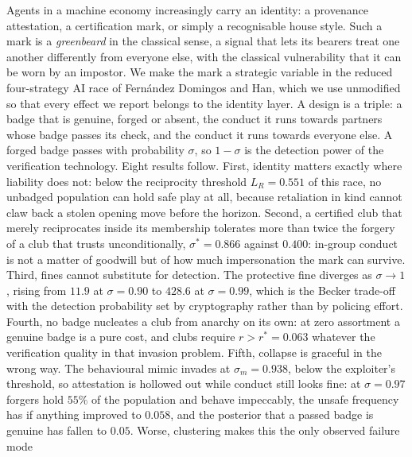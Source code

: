\noindent
Agents in a machine economy increasingly carry an identity: a provenance
attestation, a certification mark, or simply a recognisable house style. Such a
mark is a \emph{greenbeard} in the classical sense, a signal that lets its
bearers treat one another differently from everyone else, with the classical
vulnerability that it can be worn by an impostor. We make the mark a strategic
variable in the reduced four-strategy AI race of Fern\'andez Domingos and Han,
which we use unmodified so that every effect we report belongs to the identity
layer. A design is a triple: a badge that is genuine, forged or absent, the
conduct it runs towards partners whose badge passes its check, and the conduct
it runs towards everyone else. A forged badge passes with probability $\sigma$,
so $1 - \sigma$ is the detection power of the verification technology.
Eight results follow. First, identity matters exactly where liability does not:
below the reciprocity threshold $L_R = 0.551$ of this race, no unbadged
population can hold safe play at all, because retaliation in kind cannot claw
back a stolen opening move before the horizon. Second, a certified club that
merely reciprocates inside its membership tolerates more than twice the forgery
of a club that trusts unconditionally, $\sigma^{*} = 0.866$ against $0.400$:
in-group conduct is not a matter of goodwill but of how much impersonation the
mark can survive. Third, fines cannot substitute for detection. The protective
fine diverges as $\sigma \to 1$, rising from $11.9$ at $\sigma = 0.90$ to
$428.6$ at $\sigma = 0.99$, which is the Becker trade-off with the detection
probability set by cryptography rather than by policing effort. Fourth, no
badge nucleates a club from anarchy on its own: at zero assortment a genuine
badge is a pure cost, and clubs require $r > r^{*} = 0.063$ whatever the
verification quality in that invasion problem.
Fifth, collapse is graceful in the wrong way. The behavioural mimic invades at
$\sigma_m = 0.938$, below the exploiter's threshold, so attestation is hollowed
out while conduct still looks fine: at $\sigma = 0.97$ forgers hold $55\%$ of
the population and behave impeccably, the unsafe frequency has if anything
improved to $0.058$, and the posterior that a passed badge is genuine has
fallen to $0.05$. Worse, clustering makes this the only observed failure mode

